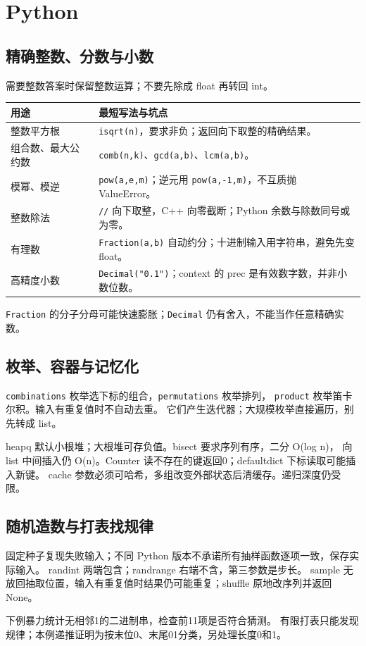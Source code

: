 \chapter{Python}
\section{精确整数、分数与小数}
需要整数答案时保留整数运算；不要先除成 float 再转回 int。
\begin{longtable}{p{56mm}p{103mm}}\toprule 用途 & 最短写法与坑点\\\midrule\endhead
整数平方根 & \texttt{isqrt(n)}，要求非负；返回向下取整的精确结果。\\
组合数、最大公约数 & \texttt{comb(n,k)}、\texttt{gcd(a,b)}、\texttt{lcm(a,b)}。\\
模幂、模逆 & \texttt{pow(a,e,m)}；逆元用 \texttt{pow(a,-1,m)}，不互质抛 ValueError。\\
整数除法 & \texttt{//} 向下取整，C++ 向零截断；Python 余数与除数同号或为零。\\
有理数 & \texttt{Fraction(a,b)} 自动约分；十进制输入用字符串，避免先变 float。\\
高精度小数 & \texttt{Decimal("0.1")}；context 的 prec 是有效数字数，并非小数位数。\\\bottomrule
\end{longtable}

\texttt{Fraction} 的分子分母可能快速膨胀；\texttt{Decimal} 仍有舍入，不能当作任意精确实数。

\newpage
\section{枚举、容器与记忆化}
\texttt{combinations} 枚举选下标的组合，\texttt{permutations} 枚举排列，
\texttt{product} 枚举笛卡尔积。输入有重复值时不自动去重。
它们产生迭代器；大规模枚举直接遍历，别先转成 list。

heapq 默认小根堆；大根堆可存负值。bisect 要求序列有序，二分 O(log n)，
向 list 中间插入仍 O(n)。Counter 读不存在的键返回0；defaultdict 下标读取可能插入新键。
cache 参数必须可哈希，多组改变外部状态后清缓存。递归深度仍受限。

\newpage
\section{随机造数与打表找规律}
固定种子复现失败输入；不同 Python 版本不承诺所有抽样函数逐项一致，保存实际输入。
randint 两端包含；randrange 右端不含，第三参数是步长。
sample 无放回抽取位置，输入有重复值时结果仍可能重复；shuffle 原地改序列并返回 None。

下例暴力统计无相邻1的二进制串，检查前11项是否符合猜测。
有限打表只能发现规律；本例递推证明为按末位0、末尾01分类，另处理长度0和1。


